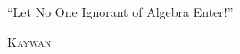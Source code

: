 \documentclass[12pt,a4paper]{memoir}
\theoremstyle{definition}
\begin{document}
	\newpage
	\normalsize
	\tableofcontents\label{TOC}
	
	\normalsize
	\pagestyle{fancy}
	\fancyhf{}
	
	
	
	
	
	
	
%	
%	


	\begin{tcolorbox}
		\begin{displayquote}
			``Let No One Ignorant of Algebra Enter!''
			\begin{flushright}
				\LARGE \textsc{Kaywan}
			\end{flushright}
		\end{displayquote}
	\end{tcolorbox}
	
\end{document}
